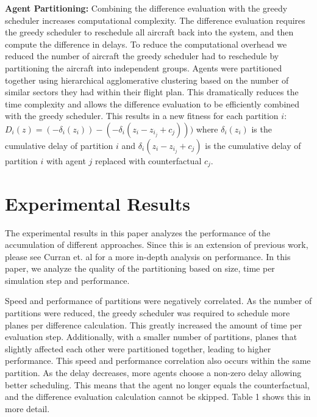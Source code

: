 \documentclass{sig-alternate}
\begin{document}
\textbf{Agent Partitioning:} Combining the difference evaluation with the greedy scheduler increases computational complexity. The difference evaluation requires the greedy scheduler to reschedule all aircraft back into the system, and then compute the difference in delays. To reduce the computational overhead we reduced the number of aircraft the greedy scheduler had to reschedule by partitioning the aircraft into independent groups. Agents were partitioned together using hierarchical agglomerative clustering based on the number of similar sectors they had within their flight plan. This dramatically reduces the time complexity and allows the difference evaluation to be efficiently combined with the greedy scheduler. This results in a new fitness for each partition $i$: $D_i(z) = (-\delta_i(z_i)) - (-\delta_i(z_i-z_{{i}_j} + c_j)))$ where \textit{$\delta_i(z_i)$} is the cumulative delay of partition $i$ and \textit{$\delta_i(z_i-z_{{i}_j} + c_j)$} is the cumulative delay of partition $i$ with agent $j$ replaced with counterfactual \textit{$c_j$}.

\section{Experimental Results}
The experimental results in this paper analyzes the performance of the accumulation of different approaches. Since this is an extension of previous work, please see Curran et. al \cite{AAMAS13-curranw} for a more in-depth analysis on performance. In this paper, we analyze the quality of the partitioning based on size, time per simulation step and performance. 

Speed and performance of partitions were negatively correlated. As the number of partitions were reduced, the greedy scheduler was required to schedule more planes per difference calculation. This greatly increased the amount of time per evaluation step. Additionally, with a smaller number of partitions, planes that slightly affected each other were partitioned together, leading to higher performance. This speed and performance correlation also occurs within the same partition. As the delay decreases, more agents choose a non-zero delay allowing better scheduling. This means that the agent no longer equals the counterfactual, and the difference evaluation calculation cannot be skipped. Table 1 shows this in more detail.
\end{document}
